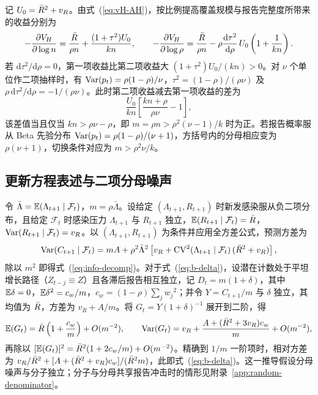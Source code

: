 记 $U_0=\bar{R}^2+v_R$。由式~(\ref{eq:vH-AH})，按比例提高覆盖规模与报告完整度所带来的收益分别为
\begin{equation}
  -\frac{\partial V_H}{\partial\log n}=\frac{\bar{R}}{\rho n}+\frac{(1+\tau^2)U_0}{kn},\qquad
  -\frac{\partial V_H}{\partial\log\rho}=\frac{\bar{R}}{\rho n}-\rho\frac{\mathrm{d}\tau^2}{\mathrm{d}\rho}\,U_0\left(1+\frac{1}{kn}\right).
\end{equation}
若 $\mathrm{d}\tau^2/\mathrm{d}\rho=0$，第一项收益比第二项收益大 $(1+\tau^2)U_0/(kn)>0$。对 $\nu$ 个单位作二项抽样时，有 $\mathrm{Var}(p_t)=\rho(1-\rho)/\nu$，$\tau^2=(1-\rho)/(\rho\nu)$ 及 $\rho\,\mathrm{d}\tau^2/\mathrm{d}\rho=-1/(\rho\nu)$。此时第二项收益减去第一项收益的差为
\begin{equation}
  \frac{U_0}{kn}\left[\frac{kn+\rho}{\rho\nu}-1\right],
\end{equation}
该差值当且仅当 $kn>\rho\nu-\rho$，即 $m=\rho n>\rho^2(\nu-1)/k$ 时为正。若报告概率服从 Beta 先验分布 $\mathrm{Var}(p_t)=\rho(1-\rho)/(\nu+1)$，方括号内的分母相应变为 $\rho(\nu+1)$，切换条件对应为 $m>\rho^2\nu/k$。

\subsection{更新方程表述与二项分母噪声}
\label{app:renewal}

令 $\bar{\Lambda}=\mathbb{E}(\Lambda_{t+1}\mid\mathcal{F}_t)$，$m=\rho\bar{\Lambda}$。设给定 $(\Lambda_{t+1},R_{t+1})$ 时新发感染服从负二项分布，且给定 $\mathcal{F}_t$ 时感染压力 $\Lambda_{t+1}$ 与 $R_{t+1}$ 独立，$\mathbb{E}(R_{t+1}\mid\mathcal{F}_t)=\bar{R}$，$\mathrm{Var}(R_{t+1}\mid\mathcal{F}_t)=v_R$。以 $(\Lambda_{t+1},R_{t+1})$ 为条件并应用全方差公式，预测方差为
\begin{equation}
  \mathrm{Var}(C_{t+1}\mid\mathcal{F}_t)=mA+\rho^2\bar{\Lambda}^2\left[v_R+\mathrm{CV}^2(\Lambda_{t+1}\mid\mathcal{F}_t)\,(\bar{R}^2+v_R)\right],
\end{equation}
除以 $m^2$ 即得式~(\ref{eq:info-decomp})。对于式~(\ref{eq:b-delta})，设潜在计数处于平坦增长路径（$Z_{t-j}\equiv Z$）且各滞后报告相互独立，记 $D_t=m(1+\delta)$，其中 $\mathbb{E}\delta=0$，$\mathbb{E}\delta^2=c_w/m$，$c_w=(1-\rho)\sum_jw_j{}^2$；并令 $Y=C_{t+1}/m$ 与 $\delta$ 独立，其均值为 $\bar{R}$，方差为 $v_R+A/m$。将 $G_t=Y(1+\delta)^{-1}$ 展开到二阶，得
\begin{equation}
  \mathbb{E}(G_t)=\bar{R}\left(1+\frac{c_w}{m}\right)+O(m^{-2}),\qquad
  \mathrm{Var}(G_t)=v_R+\frac{A+(\bar{R}^2+3v_R)c_w}{m}+O(m^{-2}),
\end{equation}
再除以 $[\mathbb{E}(G_t)]^2=\bar{R}^2(1+2c_w/m)+O(m^{-2})$。精确到 $1/m$ 一阶项时，相对方差为 $v_R/\bar{R}^2+[A+(\bar{R}^2+v_R)c_w]/(\bar{R}^2m)$，此即式~(\ref{eq:b-delta})。这一推导假设分母噪声与分子独立；分子与分母共享报告冲击时的情形见附录~\ref{app:random-denominator}。

